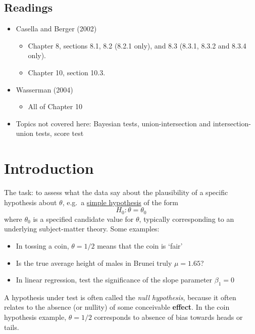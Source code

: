\documentclass[
]{book}
\providecommand{\tightlist}{%
  \setlength{\itemsep}{0pt}\setlength{\parskip}{0pt}}
\theoremstyle{definition}
\theoremstyle{definition}
\theoremstyle{definition}
\theoremstyle{definition}
\theoremstyle{remark}
\begin{document}
\hypertarget{readings-4}{%
\subsection*{Readings}\label{readings-4}}

\begin{itemize}
\tightlist
\item
  Casella and Berger (2002)

  \begin{itemize}
  \tightlist
  \item
    Chapter 8, sections 8.1, 8.2 (8.2.1 only), and 8.3 (8.3.1, 8.3.2 and 8.3.4 only).
  \item
    Chapter 10, section 10.3.
  \end{itemize}
\item
  Wasserman (2004)

  \begin{itemize}
  \tightlist
  \item
    All of Chapter 10
  \end{itemize}
\item
  Topics not covered here: Bayesian tests, union-intersection and intersection-union tests, score test
\end{itemize}

\hypertarget{introduction-1}{%
\section{Introduction}\label{introduction-1}}

The task: to assess what the data say about the plausibility of a specific hypothesis about \(\theta\), e.g.~a \uline{simple hypothesis} of the form
\[
H_0: \theta = \theta_0
\]
where \(\theta_0\) is a specified candidate value for \(\theta\), typically corresponding to an underlying subject-matter theory.
Some examples:

\begin{itemize}
\tightlist
\item
  In tossing a coin, \(\theta = 1/2\) means that the coin is `fair'
\item
  Is the true average height of males in Brunei truly \(\mu=1.65\)?
\item
  In linear regression, test the significance of the slope parameter \(\beta_1=0\)
\end{itemize}

A hypothesis under test is often called the \emph{null hypothesis}, because it often relates to the absence (or nullity) of some conceivable \textbf{effect}. In the coin hypothesis example, \(\theta=1/2\) corresponds to absence of bias towards heads or tails.
\end{document}
